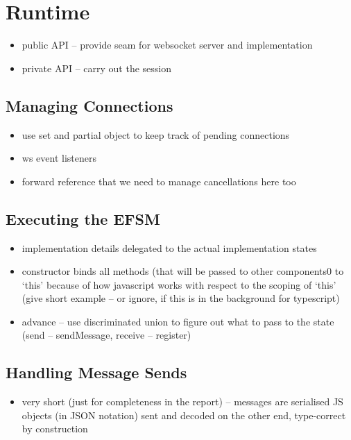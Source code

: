 \section{Runtime}
\begin{itemize}
\item public API -- provide seam for websocket server and implementation
\item private API -- carry out the session
\end{itemize}

\subsection{Managing Connections}
\begin{itemize}
\item use set and partial object to keep track of pending connections
\item ws event listeners
\item forward reference that we need to manage cancellations here too
\end{itemize}

\subsection{Executing the EFSM}
\begin{itemize}
\item implementation details delegated to the actual implementation states
\item constructor binds all methods (that will be passed to other components0 to `this' because of how javascript works with respect to the scoping of `this' (give short example -- or ignore, if this is in the background for typescript)
\item advance -- use discriminated union to figure out what to pass to the state (send -- sendMessage, receive -- register)
\end{itemize}

\subsection{Handling Message Sends}
\begin{itemize}
\item very short (just for completeness in the report) -- messages are serialised JS objects (in JSON notation) sent and decoded on the other end, type-correct by construction
\end{itemize}

